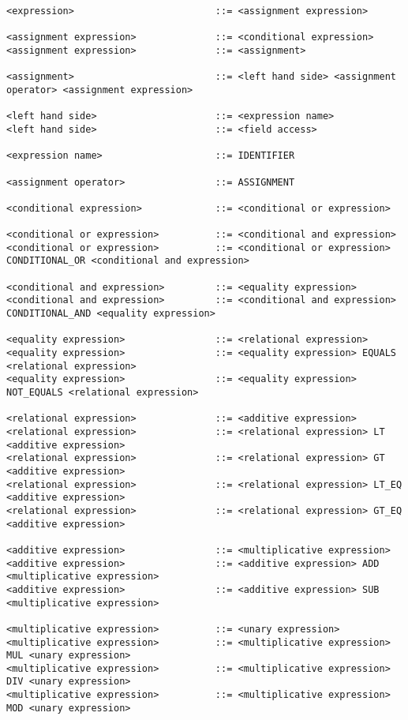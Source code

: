 \begin{lstlisting}
<expression>                         ::= <assignment expression>

<assignment expression>              ::= <conditional expression>
<assignment expression>              ::= <assignment>

<assignment>                         ::= <left hand side> <assignment operator> <assignment expression>

<left hand side>                     ::= <expression name>
<left hand side>                     ::= <field access>

<expression name>                    ::= IDENTIFIER

<assignment operator>                ::= ASSIGNMENT

<conditional expression>             ::= <conditional or expression>

<conditional or expression>          ::= <conditional and expression>
<conditional or expression>          ::= <conditional or expression> CONDITIONAL_OR <conditional and expression>

<conditional and expression>         ::= <equality expression>
<conditional and expression>         ::= <conditional and expression> CONDITIONAL_AND <equality expression>

<equality expression>                ::= <relational expression>
<equality expression>                ::= <equality expression> EQUALS <relational expression>
<equality expression>                ::= <equality expression> NOT_EQUALS <relational expression>

<relational expression>              ::= <additive expression>
<relational expression>              ::= <relational expression> LT <additive expression>
<relational expression>              ::= <relational expression> GT <additive expression>
<relational expression>              ::= <relational expression> LT_EQ <additive expression>
<relational expression>              ::= <relational expression> GT_EQ <additive expression>

<additive expression>                ::= <multiplicative expression>
<additive expression>                ::= <additive expression> ADD <multiplicative expression>
<additive expression>                ::= <additive expression> SUB <multiplicative expression>

<multiplicative expression>          ::= <unary expression>
<multiplicative expression>          ::= <multiplicative expression> MUL <unary expression>
<multiplicative expression>          ::= <multiplicative expression> DIV <unary expression>
<multiplicative expression>          ::= <multiplicative expression> MOD <unary expression>


\end{lstlisting}
